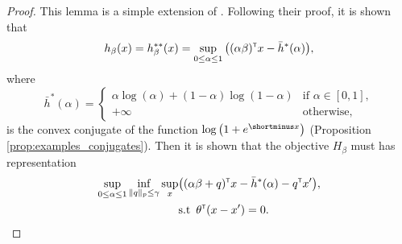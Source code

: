 \documentclass[12pt]{article}
\begin{document}
\begin{proof}
    This lemma is a simple extension of \citep[Lemma 1]{abadeh2015drologistic}. Following their proof, it is shown that \[
    h_\beta(x) = h_\beta^{**}(x) = \sup_{0\leq \alpha \leq 1} \big((\alpha \beta)^{\scriptscriptstyle \sf T} x - \bar{h}^*(\alpha)\big),
    \]where \[\bar{h}^*(\alpha) = \begin{cases}
        \alpha \log{(\alpha)} + (1-\alpha)\log{(1-\alpha)} &\text{if } \alpha\in[0,1],\\
        +\infty & \text{otherwise},
    \end{cases}\]
    is the convex conjugate of the function $\log{\big(1+e^{\shortminus x}\big)}$ (Proposition \ref{prop:examples_conjugates}). Then it is shown that the objective $H_\beta$ must has representation \begin{align*}
        \sup_{0\leq \alpha\leq 1}\inf_{\Vert q\Vert_p \leq \gamma}\sup_x &\big( (\alpha \beta + q)^{\scriptscriptstyle \sf T} x - \bar{h}^*(\alpha) -q^{\scriptscriptstyle \sf T} x'\big),\\
        &\text{s.t} \,\,\, \theta^{\scriptscriptstyle \sf T}(x-x') = 0.
    \end{align*}


\end{proof}
\end{document}
